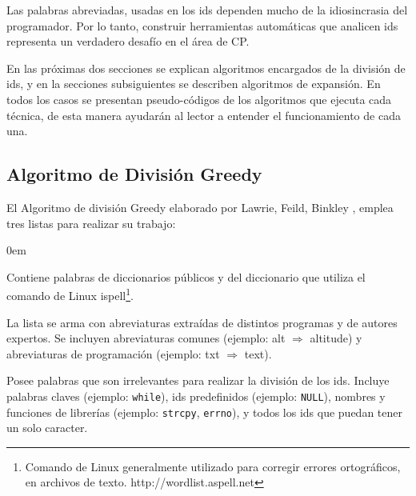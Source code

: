Las palabras abreviadas, usadas en los ids dependen mucho de la idiosincrasia del programador. Por lo tanto, construir herramientas automáticas que analicen ids representa un verdadero desafío en el área de CP.

En las próximas dos secciones se explican algoritmos encargados de la división de ids, y en la secciones subsiguientes se describen algoritmos de expansión. En todos los casos se presentan pseudo-códigos de los algoritmos que ejecuta cada técnica, de esta manera ayudarán al lector a entender el funcionamiento de cada una.


\subsection{Algoritmo de División Greedy}
\label{sec:algGre}

El Algoritmo de división Greedy elaborado por Lawrie, Feild, Binkley \cite{DLFB06,FBL06,HDD06,LFBEX07,EHPV09}, emplea tres listas para realizar su trabajo:

\begin{description}
\itemsep0em%
\item[Palabras de diccionarios:] Contiene palabras de diccionarios públicos y del diccionario que utiliza el comando de Linux \textsf{ispell}\footnote[1]{Comando de Linux generalmente utilizado para corregir errores ortográficos, en archivos de texto. http://wordlist.aspell.net}.

\item[Abreviaturas conocidas:] La lista se arma con abreviaturas extraídas de distintos programas y de autores expertos. Se incluyen abreviaturas comunes (ejemplo: \textsf{alt} $\Rightarrow$ \textsf{altitude}) y abreviaturas de programación (ejemplo: \textsf{txt} $\Rightarrow$ \textsf{text}).

\item[Palabras excluyentes (stop list):] Posee palabras que son irrelevantes para realizar la división de los ids. Incluye palabras claves (ejemplo: \texttt{while}), ids predefinidos (ejemplo: \texttt{NULL}), nombres y funciones de librerías (ejemplo: \texttt{strcpy}, \texttt{errno}), y todos los ids que puedan tener un solo caracter.
\end{description}

